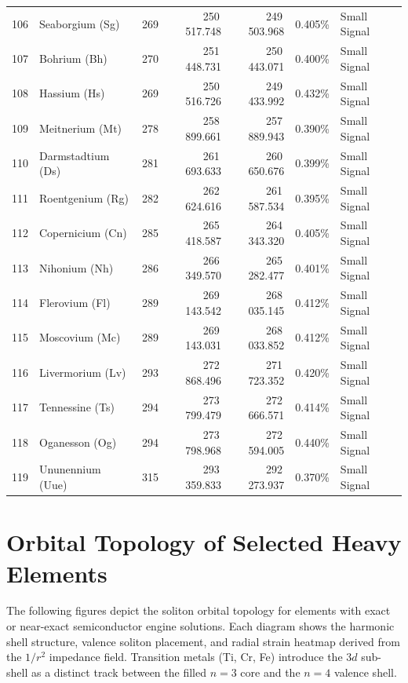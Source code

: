 \begin{footnotesize}
\begin{longtable}{r l r r r r p{3.5cm}}
106 & Seaborgium (Sg)  & 269 & 250\,517.748 & 249\,503.968 & 0.405\% & Small Signal \\
107 & Bohrium (Bh)     & 270 & 251\,448.731 & 250\,443.071 & 0.400\% & Small Signal \\
108 & Hassium (Hs)     & 269 & 250\,516.726 & 249\,433.992 & 0.432\% & Small Signal \\
109 & Meitnerium (Mt)  & 278 & 258\,899.661 & 257\,889.943 & 0.390\% & Small Signal \\
110 & Darmstadtium (Ds) & 281 & 261\,693.633 & 260\,650.676 & 0.399\% & Small Signal \\
111 & Roentgenium (Rg) & 282 & 262\,624.616 & 261\,587.534 & 0.395\% & Small Signal \\
112 & Copernicium (Cn) & 285 & 265\,418.587 & 264\,343.320 & 0.405\% & Small Signal \\
113 & Nihonium (Nh)    & 286 & 266\,349.570 & 265\,282.477 & 0.401\% & Small Signal \\
114 & Flerovium (Fl)   & 289 & 269\,143.542 & 268\,035.145 & 0.412\% & Small Signal \\
115 & Moscovium (Mc)   & 289 & 269\,143.031 & 268\,033.852 & 0.412\% & Small Signal \\
116 & Livermorium (Lv) & 293 & 272\,868.496 & 271\,723.352 & 0.420\% & Small Signal \\
117 & Tennessine (Ts)  & 294 & 273\,799.479 & 272\,666.571 & 0.414\% & Small Signal \\
118 & Oganesson (Og)   & 294 & 273\,798.968 & 272\,594.005 & 0.440\% & Small Signal \\
\midrule
119 & Ununennium (Uue) & 315 & 293\,359.833 & 292\,273.937 & 0.370\% & Small Signal \\
\bottomrule
\end{longtable}
\end{footnotesize}

\section{Orbital Topology of Selected Heavy Elements}

The following figures depict the soliton orbital topology for elements with exact or near-exact semiconductor engine solutions. Each diagram shows the harmonic shell structure, valence soliton placement, and radial strain heatmap derived from the $1/r^2$ impedance field. Transition metals (Ti, Cr, Fe) introduce the $3d$ sub-shell as a distinct track between the filled $n=3$ core and the $n=4$ valence shell.

